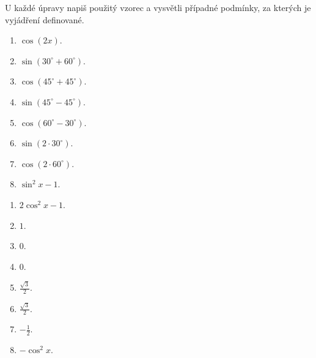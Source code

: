 \documentclass[11pt,a4paper]{article}
\begin{document}
U každé úpravy napiš použitý vzorec a vysvětli případné podmínky, za kterých je vyjádření definované.
\begin{zadaniReseniBox}[title={Domácí úkol}]
\begin{enumerate}[label=\alph*)]
\item $\cos(2x)$.
\item $\sin(30^\circ+60^\circ)$.
\item $\cos(45^\circ+45^\circ)$.
\item $\sin(45^\circ-45^\circ)$.
\item $\cos(60^\circ-30^\circ)$.
\item $\sin(2\cdot30^\circ)$.
\item $\cos(2\cdot60^\circ)$.
\item $\sin^2x-1$.
\end{enumerate}
\tcblower
\begin{enumerate}[label=\alph*)]
\item $2\cos^2x-1$.
\item $1$.
\item $0$.
\item $0$.
\item $\frac{\sqrt3}{2}$.
\item $\frac{\sqrt3}{2}$.
\item $-\frac{1}{2}$.
\item $-\cos^2x$.
\end{enumerate}
\end{zadaniReseniBox}
\end{document}
